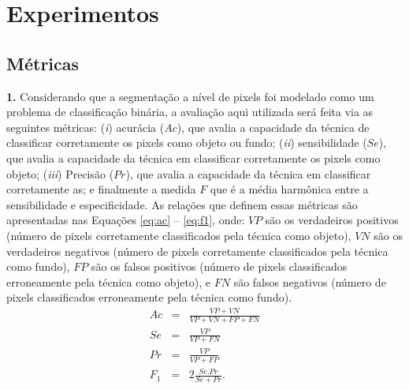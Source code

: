 
\section{Experimentos}
\subsection{Métricas}

\textbf{1. }
Considerando que a segmentação a nível de pixels foi modelado como um problema de classificação binária, a avaliação aqui utilizada será feita via as seguintes métricas: 
(\textit{i}) acurácia ($Ac$), que avalia a capacidade da técnica de classificar corretamente os pixels como objeto ou fundo; 
(\textit{ii}) sensibilidade ($Se$), que avalia a capacidade da técnica em classificar corretamente os pixels como objeto; 
(\textit{iii}) Precisão ($Pr$), que avalia a capacidade da técnica em classificar corretamente as; 
e finalmente a medida $F$ que é a média harmônica entre a sensibilidade e especificidade. As relações que definem essas métricas são apresentadas nas Equações \eqref{eq:ac} – \eqref{eq:f1}, onde: 
$VP$ são os verdadeiros positivos (número de pixels corretamente classificados pela técnica como objeto), 
$VN$ são os verdadeiros negativos (número de pixels corretamente classificados pela técnica como fundo), 
$FP$ são os falsos positivos (número de pixels classificados erroneamente pela técnica como objeto), e 
$FN$ são falsos negativos (número de pixels classificados erroneamente pela técnica como fundo). 
\begin{eqnarray}
\label{eq:ac}
Ac &=& \frac{VP + VN}{VP + VN + FP + FN}\\
\label{eq:se}
Se &=& \frac{VP}{VP + FN}\\
\label{eq:es}
Pr &=& \frac{VP}{VP + FP}\\
\label{eq:f1}
F_1 &=& 2\frac{Se.Pr}{Se + Pr}.
\end{eqnarray}

